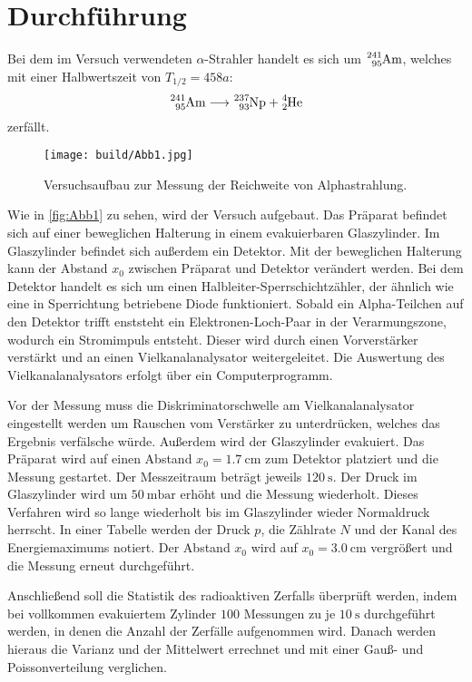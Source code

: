\section{Durchführung}
\label{sec:Durchführung}
Bei dem im Versuch verwendeten $\alpha$-Strahler handelt es sich um $\ce{^241_95\text{Am}}$, welches mit einer Halbwertszeit von $T_{1/2} = 458 a$:
\begin{equation}
\ce{^241_95\text{Am}} \longrightarrow \ce{^237_93\text{Np}} + \ce{^4_2\text{He}}
\end{equation}
zerfällt.

\begin{figure}[H]
    \centering
    \texttt{[image: build/Abb1.jpg]}
    \caption {Versuchsaufbau zur Messung der Reichweite von Alphastrahlung\cite[2]{V701}.}
    \label{fig:Abb1}
\end{figure}

Wie in \autoref{fig:Abb1} zu sehen, wird der Versuch aufgebaut.
Das Präparat befindet sich auf einer beweglichen Halterung in einem evakuierbaren Glaszylinder. Im Glaszylinder befindet sich 
außerdem ein Detektor. Mit der beweglichen Halterung kann der Abstand $x_0$ zwischen Präparat und Detektor verändert werden.
Bei dem Detektor handelt es sich um einen Halbleiter-Sperrschichtzähler, der ähnlich wie eine in Sperrichtung betriebene Diode
funktioniert. Sobald ein Alpha-Teilchen auf den Detektor trifft enststeht ein Elektronen-Loch-Paar in der Verarmungszone, wodurch
ein Stromimpuls entsteht. Dieser wird durch einen Vorverstärker verstärkt und an einen Vielkanalanalysator weitergeleitet.
Die Auswertung des Vielkanalanalysators erfolgt über ein Computerprogramm.

Vor der Messung muss die Diskriminatorschwelle am Vielkanalanalysator eingestellt werden um Rauschen vom Verstärker zu unterdrücken, welches das Ergebnis verfälsche  würde.
Außerdem wird der Glaszylinder evakuiert.
Das Präparat wird auf einen Abstand $x_0= \qty{1.7}{\centi\meter}$ zum Detektor platziert und die Messung gestartet.
Der Messzeitraum beträgt jeweils $\qty{120}{\second}$. Der Druck im Glaszylinder wird um $\qty{50}{\milli\bar}$ erhöht und die Messung wiederholt.
Dieses Verfahren wird so lange wiederholt bis im Glaszylinder wieder Normaldruck herrscht.
In einer Tabelle werden der Druck $p$, die Zählrate $N$ und der Kanal des Energiemaximums notiert.
Der Abstand $x_0$ wird auf $x_0= \qty{3.0}{\centi\meter}$ vergrößert und die Messung erneut durchgeführt.


Anschließend soll die Statistik des radioaktiven Zerfalls überprüft werden,
indem bei vollkommen evakuiertem Zylinder $100$ Messungen zu je $\SI{10}{\second}$ durchgeführt werden, in denen die Anzahl der Zerfälle aufgenommen wird.
Danach werden hieraus die Varianz und der Mittelwert errechnet und mit einer Gauß- und Poissonverteilung verglichen. 